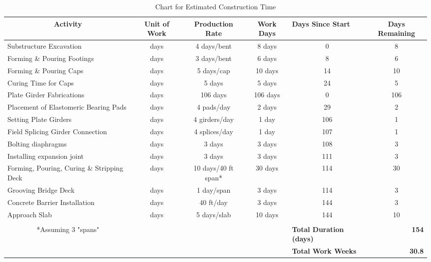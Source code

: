 \begin{table}[htbp]
\caption{Chart for Estimated Construction Time}
\begin{tabular}{|l|c|c|c|c|c|}
\hline
\multicolumn{1}{|c|}{\textbf{Activity}} & \textbf{Unit of Work} & \textbf{Production Rate} & \textbf{Work Days} & \multicolumn{1}{l|}{\textbf{Days Since Start}} & \textbf{Days Remaining} \\ \hline
Substructure Excavation & days & 4 days/bent & 8 days & 0 & 8 \\ \hline
Forming \& Pouring Footings & days & 3 days/bent & 6 days & 8 & 6 \\ \hline
Forming \& Pouring Caps & days & 5 days/cap & 10 days & 14 & 10 \\ \hline
Curing Time for Caps & days & 5 days & 5 days & 24 & 5 \\ \hline
Plate Girder Fabrications & days & 106 days & 106 days & 0 & 106 \\ \hline
Placement of Elastomeric Bearing Pads & days & 4 pads/day & 2 days & 29 & 2 \\ \hline
Setting Plate Girders & days & 4 girders/day & 1 day & 106 & 1 \\ \hline
Field Splicing Girder Connection & days & 4 splices/day & 1 day & 107 & 1 \\ \hline
Bolting diaphragms & days & 3 days & 3 days & 108 & 3 \\ \hline
Installing expansion joint & days & 3 days & 3 days & 111 & 3 \\ \hline
Forming, Pouring, Curing \& Stripping Deck & days & 10 days/40 ft span* & 30 days & 114 & 30 \\ \hline
Grooving Bridge Deck & days & 1 day/span & 3 days & 114 & 3 \\ \hline
Concrete Barrier Installation & days & 40 ft/day & 3 days & 144 & 3 \\ \hline
Approach Slab & days & 5 days/slab & 10 days & 144 & 10 \\ \hline
\multicolumn{1}{|c|}{} &  &  &  & \multicolumn{1}{l|}{} & \multicolumn{1}{l|}{} \\ \hline
\multicolumn{1}{|c|}{*Assuming 3 "spans"} &  &  &  & \multicolumn{1}{l|}{\textbf{Total Duration (days)}} & \multicolumn{1}{r|}{\textbf{154}} \\ \hline
\multicolumn{1}{|c|}{} &  &  &  & \multicolumn{1}{l|}{\textbf{Total Work Weeks}} & \multicolumn{1}{r|}{\textbf{30.8}} \\ \hline
\end{tabular}
\label{}
\end{table}
